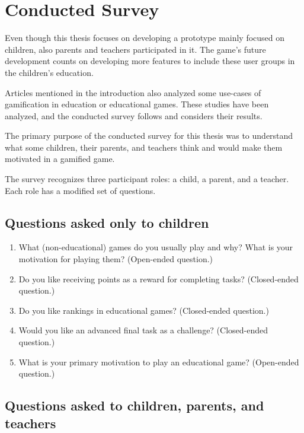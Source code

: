 \section{Conducted Survey}

Even though this thesis focuses on developing a prototype mainly focused on children, also parents and teachers participated in it.
The game's future development counts on developing more features to include these user groups in the children's education.

Articles mentioned in the introduction also analyzed some use-cases of gamification in education or educational games.
These studies have been analyzed, and the conducted survey follows and considers their results. 

The primary purpose of the conducted survey for this thesis was to understand what some children, their parents, and teachers think and would make them motivated in a gamified game.

The survey recognizes three participant roles: a child, a parent, and a teacher.
Each role has a modified set of questions.

\subsection*{Questions asked only to children}

\begin{enumerate}
    \item What (non-educational) games do you usually play and why? What is your motivation for playing them? (Open-ended question.)
    \item Do you like receiving points as a reward for completing tasks? (Closed-ended question.)
    \item Do you like rankings in educational games? (Closed-ended question.)
    \item Would you like an advanced final task as a challenge? (Closed-ended question.)
    \item What is your primary motivation to play an educational game? (Open-ended question.)
\end{enumerate}

\subsection*{Questions asked to children, parents, and teachers}

